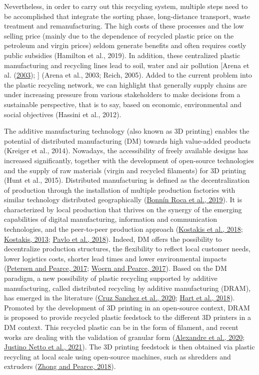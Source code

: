 \documentclass[]{elsarticle} %
\begin{document}
Nevertheless, in order to carry out this recycling system, multiple steps need to be accomplished that integrate the sorting phase, long-distance transport, waste treatment and remanufacturing.
The high costs of these processes and the low selling price (mainly due to the dependence of recycled plastic price on the petroleum and virgin prices) seldom generate benefits and often requires costly public subsidies (Hamilton et al., 2019).
In addition, these centralized plastic manufacturing and recycling lines lead to soil, water and air pollution {[}Arena et al. (\protect\hyperlink{ref-Arena2003}{2003}); {]} (Arena et al., 2003; Reich, 2005).
Added to the current problem into the plastic recycling network, we can highlight that generally supply chains are under increasing pressure from various stakeholders to make decisions from a sustainable perspective, that is to say, based on economic, environmental and social objectives (Hassini et al., 2012).

The additive manufacturing technology (also known as 3D printing) enables the potential of distributed manufacturing (DM) towards high value-added products (Kreiger et al., 2014).
Nowadays, the accessibility of freely available designs has increased significantly, together with the development of open-source technologies and the supply of raw materials (virgin and recycled filaments) for 3D printing (Hunt et al., 2015).
Distributed manufacturing is defined as the decentralization of production through the installation of multiple production factories with similar technology distributed geographically (\protect\hyperlink{ref-BonninRoca2019}{Bonnín Roca et al., 2019}).
It is characterized by local production that thrives on the synergy of the emerging capabilities of digital manufacturing, information and communication technologies, and the peer-to-peer production approach (\protect\hyperlink{ref-Kostakis2018}{Kostakis et al., 2018}; \protect\hyperlink{ref-Kostakis2013b}{Kostakis, 2013}; \protect\hyperlink{ref-Pavlo2018}{Pavlo et al., 2018}).
Indeed, DM offers the possibility to decentralize production structures, the flexibility to reflect local customer needs, lower logistics costs, shorter lead times and lower environmental impacts (\protect\hyperlink{ref-Petersen2017a}{Petersen and Pearce, 2017}; \protect\hyperlink{ref-Woern2017}{Woern and Pearce, 2017}).
Based on the DM paradigm, a new possibility of plastic recycling supported by additive manufacturing, called distributed recycling by additive manufacturing (DRAM), has emerged in the literature (\protect\hyperlink{ref-CruzSanchez2020}{Cruz Sanchez et al., 2020}; \protect\hyperlink{ref-Hart2018}{Hart et al., 2018}).
Promoted by the development of 3D printing in an open-source context, DRAM is proposed to provide recycled plastic feedstock to the different 3D printers in a DM context.
This recycled plastic can be in the form of filament, and recent works are dealing with the validation of granular form (\protect\hyperlink{ref-Arthur2020}{Alexandre et al., 2020}; \protect\hyperlink{ref-JustinoNetto2021}{Justino Netto et al., 2021}).
The 3D printing feedstock is then obtained via plastic recycling at local scale using open-source machines, such as shredders and extruders (\protect\hyperlink{ref-Zhong2018}{Zhong and Pearce, 2018}).
\end{document}
